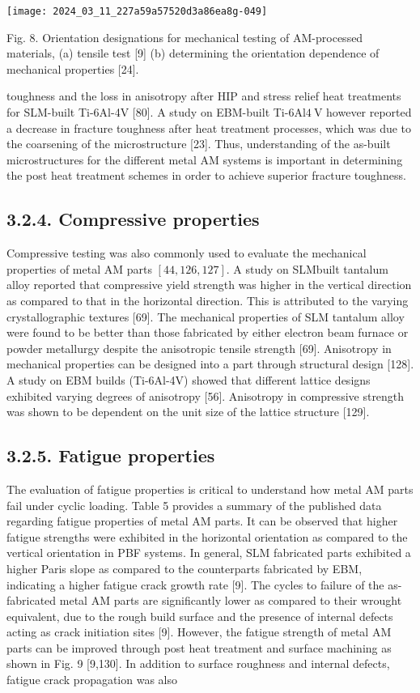 \documentclass[10pt]{article}
\begin{document}
\begin{center}
\texttt{[image: 2024\_03\_11\_227a59a57520d3a86ea8g-049]}
\end{center}

Fig. 8. Orientation designations for mechanical testing of AM-processed materials, (a) tensile test [9] (b) determining the orientation dependence of mechanical properties [24].

toughness and the loss in anisotropy after HIP and stress relief heat treatments for SLM-built Ti-6Al-4V [80]. A study on EBM-built Ti-6Al$4 \mathrm{~V}$ however reported a decrease in fracture toughness after heat treatment processes, which was due to the coarsening of the microstructure [23]. Thus, understanding of the as-built microstructures for the different metal AM systems is important in determining the post heat treatment schemes in order to achieve superior fracture toughness.

\subsection*{3.2.4. Compressive properties}
Compressive testing was also commonly used to evaluate the mechanical properties of metal AM parts $[44,126,127]$. A study on SLMbuilt tantalum alloy reported that compressive yield strength was higher in the vertical direction as compared to that in the horizontal direction. This is attributed to the varying crystallographic textures [69]. The mechanical properties of SLM tantalum alloy were found to be better than those fabricated by either electron beam furnace or powder metallurgy despite the anisotropic tensile strength [69]. Anisotropy in mechanical properties can be designed into a part through structural design [128]. A study on EBM builds (Ti-6Al-4V) showed that different lattice designs exhibited varying degrees of anisotropy [56]. Anisotropy in compressive strength was shown to be dependent on the unit size of the lattice structure [129].

\subsection*{3.2.5. Fatigue properties}
The evaluation of fatigue properties is critical to understand how metal AM parts fail under cyclic loading. Table 5 provides a summary of the published data regarding fatigue properties of metal AM parts. It can be observed that higher fatigue strengths were exhibited in the horizontal orientation as compared to the vertical orientation in PBF systems. In general, SLM fabricated parts exhibited a higher Paris slope as compared to the counterparts fabricated by EBM, indicating a higher fatigue crack growth rate [9]. The cycles to failure of the as-fabricated metal AM parts are significantly lower as compared to their wrought equivalent, due to the rough build surface and the presence of internal defects acting as crack initiation sites [9]. However, the fatigue strength of metal AM parts can be improved through post heat treatment and surface machining as shown in Fig. 9 [9,130]. In addition to surface roughness and internal defects, fatigue crack propagation was also
\end{document}
